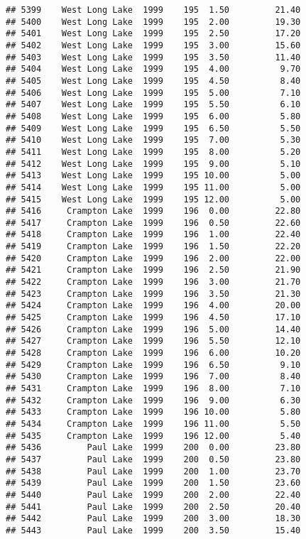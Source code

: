 \documentclass[
]{article}
\begin{document}
\begin{verbatim}
## 5399    West Long Lake  1999    195  1.50         21.40
## 5400    West Long Lake  1999    195  2.00         19.30
## 5401    West Long Lake  1999    195  2.50         17.20
## 5402    West Long Lake  1999    195  3.00         15.60
## 5403    West Long Lake  1999    195  3.50         11.40
## 5404    West Long Lake  1999    195  4.00          9.70
## 5405    West Long Lake  1999    195  4.50          8.40
## 5406    West Long Lake  1999    195  5.00          7.10
## 5407    West Long Lake  1999    195  5.50          6.10
## 5408    West Long Lake  1999    195  6.00          5.80
## 5409    West Long Lake  1999    195  6.50          5.50
## 5410    West Long Lake  1999    195  7.00          5.30
## 5411    West Long Lake  1999    195  8.00          5.20
## 5412    West Long Lake  1999    195  9.00          5.10
## 5413    West Long Lake  1999    195 10.00          5.00
## 5414    West Long Lake  1999    195 11.00          5.00
## 5415    West Long Lake  1999    195 12.00          5.00
## 5416     Crampton Lake  1999    196  0.00         22.80
## 5417     Crampton Lake  1999    196  0.50         22.60
## 5418     Crampton Lake  1999    196  1.00         22.40
## 5419     Crampton Lake  1999    196  1.50         22.20
## 5420     Crampton Lake  1999    196  2.00         22.00
## 5421     Crampton Lake  1999    196  2.50         21.90
## 5422     Crampton Lake  1999    196  3.00         21.70
## 5423     Crampton Lake  1999    196  3.50         21.30
## 5424     Crampton Lake  1999    196  4.00         20.00
## 5425     Crampton Lake  1999    196  4.50         17.10
## 5426     Crampton Lake  1999    196  5.00         14.40
## 5427     Crampton Lake  1999    196  5.50         12.10
## 5428     Crampton Lake  1999    196  6.00         10.20
## 5429     Crampton Lake  1999    196  6.50          9.10
## 5430     Crampton Lake  1999    196  7.00          8.40
## 5431     Crampton Lake  1999    196  8.00          7.10
## 5432     Crampton Lake  1999    196  9.00          6.30
## 5433     Crampton Lake  1999    196 10.00          5.80
## 5434     Crampton Lake  1999    196 11.00          5.50
## 5435     Crampton Lake  1999    196 12.00          5.40
## 5436         Paul Lake  1999    200  0.00         23.80
## 5437         Paul Lake  1999    200  0.50         23.80
## 5438         Paul Lake  1999    200  1.00         23.70
## 5439         Paul Lake  1999    200  1.50         23.60
## 5440         Paul Lake  1999    200  2.00         22.40
## 5441         Paul Lake  1999    200  2.50         20.40
## 5442         Paul Lake  1999    200  3.00         18.30
## 5443         Paul Lake  1999    200  3.50         15.40

\end{verbatim}
\end{document}
